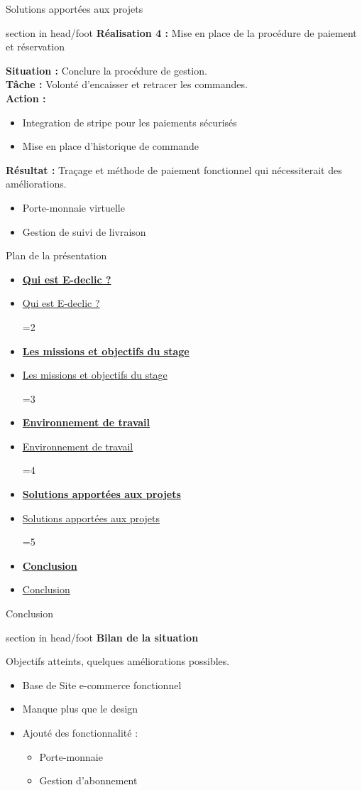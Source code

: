 \documentclass{beamer}
\newcommand{\planLine}[4]{
  \ifnum#1=#2
    \item \hyperlink{#3}{\textbf{\large #4}}
  \else
    \item \hyperlink{#3}{#4}
  \fi
}
\newcommand{\planSlide}[1]{
  	\begin{frame}{Plan de la présentation}
  		\begin{center}
  			\begin{minipage}{1\textwidth}
				\begin{itemize}
      			\planLine{#1}{1}{organisation}{Qui est E-declic ?}
      			\planLine{#1}{2}{sujet}{Les missions et objectifs du stage}
      			\planLine{#1}{3}{environnement}{Environnement de travail}
      			\planLine{#1}{4}{realisation}{Solutions apportées aux projets}
      			\planLine{#1}{5}{conclusion}{Conclusion}
	    		\end{itemize}
  		\end{minipage}
	\end{center}
	\vfill
	\end{frame}
}
\begin{document}
\begin{frame}{Solutions apportées aux projets}
	\begin{beamercolorbox}[wd=\paperwidth,ht=1.5em,dp=0.5em,leftskip=0.5cm]{section in head/foot}
  		\large \textbf{Réalisation 4 :} \normalsize Mise en place de la procédure de paiement et réservation
	\end{beamercolorbox}
	\vspace{0.5em}
	\begin{center}
  		\begin{minipage}{0.9\textwidth}
  			\textbf{Situation :} Conclure la procédure de gestion.\\
  			\textbf{Tâche :} Volonté d'encaisser et retracer les commandes.\\
  			\textbf{Action :}
  				\begin{itemize}
  					\item Integration de stripe pour les paiements sécurisés
  					\item Mise en place d'historique de commande
  				\end{itemize}
			\textbf{Résultat :} Traçage et méthode de paiement fonctionnel qui nécessiterait des améliorations.
				\begin{itemize}
					\item Porte-monnaie virtuelle
					\item Gestion de suivi de livraison
				\end{itemize}
  		\end{minipage}
	\end{center}
	\vfill
\end{frame}

\planSlide{5}

\begin{frame}[label=conclusion]{Conclusion}
  	\begin{beamercolorbox}[wd=\paperwidth,ht=1.5em,dp=0.5em,leftskip=0.5cm]{section in head/foot}
  		\large \textbf{Bilan de la situation}
	\end{beamercolorbox}
	\vspace{0.5em}
	\begin{center}
  		\begin{minipage}{0.9\textwidth}
	  		Objectifs atteints, quelques améliorations possibles.
  			\begin{itemize}
  				\item Base de Site e-commerce fonctionnel
			  	\item Manque plus que le design
			  	\item Ajouté des fonctionnalité : 
			  	\begin{itemize}
			  		\item Porte-monnaie
			  		\item Gestion d'abonnement
			  	\end{itemize}
			\end{itemize}
  		\end{minipage}
	\end{center}
	\vfill
\end{frame}
\end{document}
